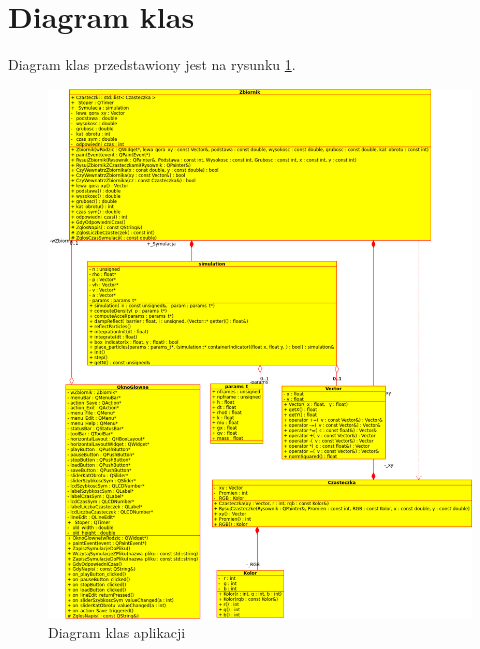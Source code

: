 \section{Diagram klas}

Diagram klas przedstawiony jest na rysunku \ref{fig:diagram_klas}.

\begin{figure}
 \begin{center}
  \includegraphics[width=\textwidth] {rysunki/class_diagram1}
 \end{center}
 \caption{Diagram klas aplikacji}
 \label{fig:diagram_klas}
\end{figure}
